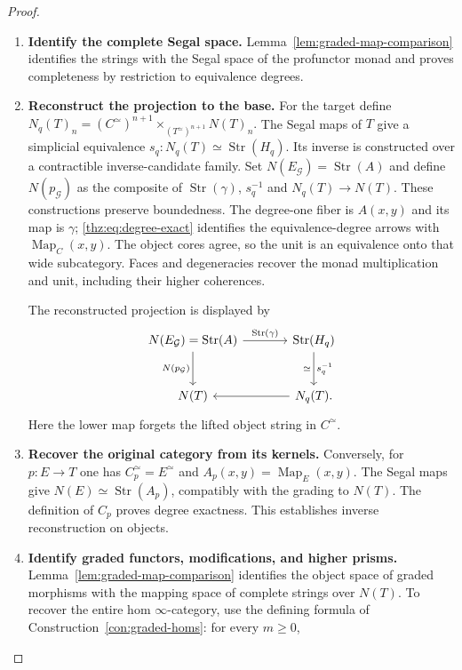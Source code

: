 \documentclass[oneside]{article}
\theoremstyle{plain}
\theoremstyle{definition}
\theoremstyle{remark}
\newcommand{\Map}{\operatorname{Map}}
\newcommand{\core}{\simeq}
\begin{document}
\begin{proof}
\leavevmode
\begin{enumerate}
\item \textbf{Identify the complete Segal space.}
Lemma~\ref{lem:graded-map-comparison} identifies the strings with the
Segal space of the profunctor monad and proves completeness by
restriction to equivalence degrees.
\item \textbf{Reconstruct the projection to the base.} For the target define $N_q(T)_n=(C^\core)^{n+1} \times_{(T^\core)^{n+1}}N(T)_n.$ The Segal maps of $T$ give a simplicial equivalence
$s_q:N_q(T)\simeq\operatorname{Str}(H_q)$.  Its inverse is constructed
over a contractible inverse-candidate family.  Set
$N(E_{\mathcal G})=\operatorname{Str}(A)$ and define
$N(p_{\mathcal G})$ as the composite of $\operatorname{Str}(\gamma)$,
$s_q^{-1}$ and $N_q(T)\to N(T)$.  These constructions preserve boundedness.
The degree-one fiber is $A(x,y)$ and its map is $\gamma$;
\eqref{thz:eq:degree-exact} identifies the equivalence-degree arrows with
$\Map_C(x,y)$.  The object cores agree, so the unit is an equivalence
onto that wide subcategory.  Faces and degeneracies recover the monad
multiplication and unit, including their higher coherences.
\begin{samepage}
The reconstructed projection is displayed by
\[
\begin{tikzcd}[column sep=large,row sep=large]
 N(E_{\mathcal G})=\operatorname{Str}(A)
   \ar[r,"\operatorname{Str}(\gamma)"]\ar[d,"N(p_{\mathcal G})"']&
 \operatorname{Str}(H_q)\ar[d,"s_q^{-1}","\simeq"']\\
 N(T)&N_q(T)\ar[l].
\end{tikzcd}
\]
Here the lower map forgets the lifted object string in $C^\core$.
\end{samepage}
\item \textbf{Recover the original category from its kernels.} Conversely, for $p:E\to T$ one has $C_p^\core=E^\core$ and
$A_p(x,y)=\Map_E(x,y)$.  The Segal maps give
$N(E)\simeq\operatorname{Str}(A_p)$, compatibly with the grading to
$N(T)$.  The definition of $C_p$ proves degree exactness.  This establishes
inverse reconstruction on objects.
\item \textbf{Identify graded functors, modifications, and higher prisms.}
Lemma~\ref{lem:graded-map-comparison} identifies the object space
of graded morphisms with the mapping space of complete strings over
$N(T)$. To recover the entire hom $\infty$-category, use the defining
formula of Construction~\ref{con:graded-homs}: for every $m\geq0$,

\end{enumerate}
\end{proof}
\end{document}
